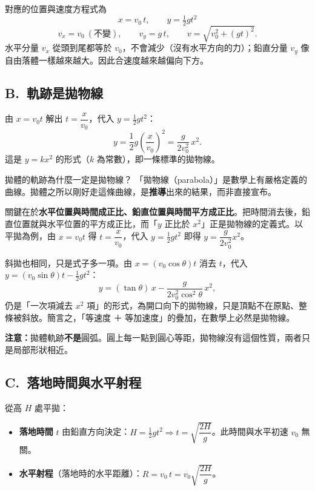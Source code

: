 \documentclass[11pt]{article}
\begin{document}
對應的位置與速度方程式為
$$\boxed{\,x=v_0\,t,\qquad y=\tfrac12 g t^2\,}$$
$$v_x=v_0\ (\text{不變}),\qquad v_y=g\,t,\qquad v=\sqrt{v_0^2+(gt)^2}.$$
水平分量 $v_x$ 從頭到尾都等於 $v_0$，不會減少（沒有水平方向的力）；鉛直分量 $v_y$ 像自由落體一樣越來越大。因此合速度越來越偏向下方。


\subsection*{\sffamily B.\ 軌跡是拋物線}

由 $x=v_0 t$ 解出 $t=\dfrac{x}{v_0}$，代入 $y=\tfrac12 g t^2$：
$$y=\frac12 g\left(\frac{x}{v_0}\right)^2=\frac{g}{2v_0^2}\,x^2.$$
這是 $y=k x^2$ 的形式（$k$ 為常數），即一條標準的拋物線。

\begin{補充框}{拋體的軌跡為什麼一定是拋物線？}
「拋物線（parabola）」是數學上有嚴格定義的曲線。拋體之所以剛好走這條曲線，是\textbf{推導}出來的結果，而非直接宣布。

關鍵在於\textbf{水平位置與時間成正比、鉛直位置與時間平方成正比}。把時間消去後，鉛直位置就與水平位置的平方成正比，而「$y$ 正比於 $x^2$」正是拋物線的定義式。以平拋為例，由 $x=v_0 t$ 得 $t=\dfrac{x}{v_0}$，代入 $y=\tfrac12 g t^2$ 即得 $y=\dfrac{g}{2v_0^2}x^2$。

斜拋也相同，只是式子多一項。由 $x=(v_0\cos\theta)t$ 消去 $t$，代入 $y=(v_0\sin\theta)t-\tfrac12 g t^2$：
$$y=(\tan\theta)\,x-\frac{g}{2v_0^2\cos^2\theta}\,x^2,$$
仍是「一次項減去 $x^2$ 項」的形式，為開口向下的拋物線，只是頂點不在原點、整條被斜放。簡言之，「等速度 ＋ 等加速度」的疊加，在數學上必然是拋物線。

\textbf{注意：}拋體軌跡\textbf{不是}圓弧。圓上每一點到圓心等距，拋物線沒有這個性質，兩者只是局部形狀相近。
\end{補充框}

\subsection*{\sffamily C.\ 落地時間與水平射程}

從高 $H$ 處平拋：
\begin{itemize}\setlength{\itemsep}{1pt}
\item \textbf{落地時間} $t$ 由鉛直方向決定：$H=\tfrac12 g t^2\Rightarrow t=\sqrt{\dfrac{2H}{g}}$。此時間與水平初速 $v_0$ 無關。
\item \textbf{水平射程}（落地時的水平距離）：$R=v_0\,t=v_0\sqrt{\dfrac{2H}{g}}$。
\end{itemize}
\end{document}
